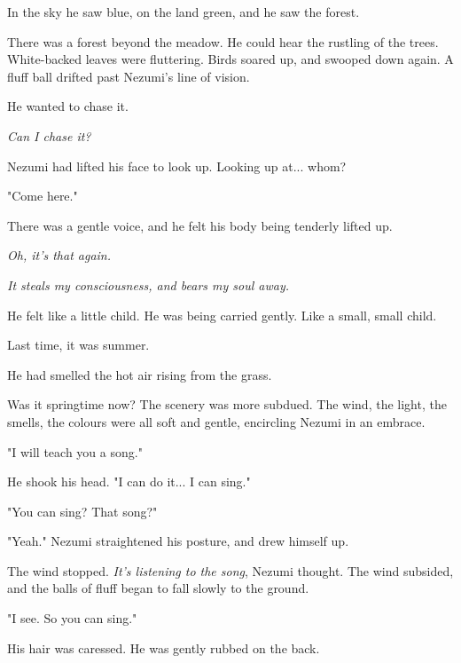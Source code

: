 In the sky he saw blue, on the land green, and he saw the forest.

There was a forest beyond the meadow. He could hear the rustling of the
trees. White-backed leaves were fluttering. Birds soared up, and swooped
down again. A fluff ball drifted past Nezumi's line of vision.

He wanted to chase it.

\emph{Can I chase it?}

Nezumi had lifted his face to look up. Looking up at... whom?

"Come here."

There was a gentle voice, and he felt his body being tenderly lifted up.

\emph{Oh, it's that again.}

\emph{It steals my consciousness, and bears my soul away.}

He felt like a little child. He was being carried gently. Like a small,
small child.

Last time, it was summer.

He had smelled the hot air rising from the grass.

Was it springtime now? The scenery was more subdued. The wind, the
light, the smells, the colours were all soft and gentle, encircling
Nezumi in an embrace.

"I will teach you a song."

He shook his head. "I can do it... I can sing."

"You can sing? That song?"

"Yeah." Nezumi straightened his posture, and drew himself up.


The wind stopped. \emph{It's listening to the song}, Nezumi thought. The wind
subsided, and the balls of fluff began to fall slowly to the ground.

"I see. So you can sing."

His hair was caressed. He was gently rubbed on the back.

